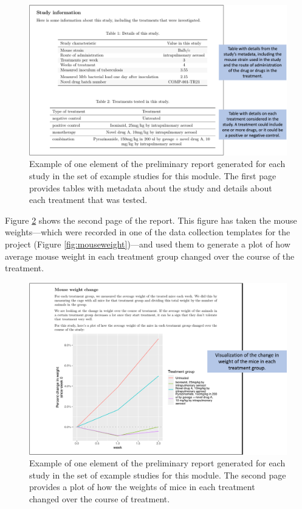 \documentclass[]{tufte-book}
\begin{document}
\begin{figure}
\includegraphics[width=\textwidth]{figures/project_study_info_table} \caption[Example of one element of the preliminary report generated for each study in the set of example studies for this module]{Example of one element of the preliminary report generated for each study in the set of example studies for this module. The first page provides tables with metadata about the study and details about each treatment that was tested.}\label{fig:studytable}
\end{figure}

Figure \ref{fig:mouseweightsplot} shows the second page of the report. This
figure has taken the mouse weights---which were recorded in one of the data
collection templates for the project (Figure \ref{fig:mouseweight})---and used
them to generate a plot of how average mouse weight in each treatment group
changed over the course of the treatment.

\begin{figure}
\includegraphics[width=\textwidth]{figures/project_mouse_weights_graph} \caption[Example of one element of the preliminary report generated for each study in the set of example studies for this module]{Example of one element of the preliminary report generated for each study in the set of example studies for this module. The second page provides a plot of how the weights of mice in each treatment changed over the course of treatment.}\label{fig:mouseweightsplot}
\end{figure}
\end{document}
